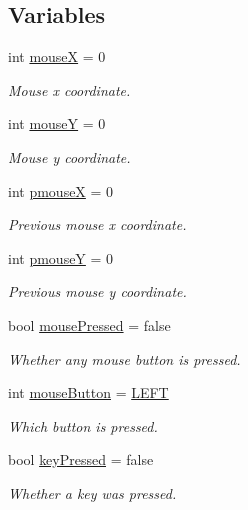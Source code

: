 \subsection*{\-Variables}
\begin{DoxyCompactItemize}
\item 
int \hyperlink{namespacecprocessing_aca55645dc8d20d72de21bc8cf2c5bcd0}{mouse\-X} = 0
\begin{DoxyCompactList}\small\item\em \-Mouse x coordinate. \end{DoxyCompactList}\item 
int \hyperlink{namespacecprocessing_ac81e2d0a39a3d606e9e6d870e31534ee}{mouse\-Y} = 0
\begin{DoxyCompactList}\small\item\em \-Mouse y coordinate. \end{DoxyCompactList}\item 
int \hyperlink{namespacecprocessing_afa6d39daa03165222e3c969b1ce26571}{pmouse\-X} = 0
\begin{DoxyCompactList}\small\item\em \-Previous mouse x coordinate. \end{DoxyCompactList}\item 
int \hyperlink{namespacecprocessing_a51d209877748101ea857d64bc9b6ff2d}{pmouse\-Y} = 0
\begin{DoxyCompactList}\small\item\em \-Previous mouse y coordinate. \end{DoxyCompactList}\item 
bool \hyperlink{namespacecprocessing_a02981e7550d1c27e3ae792450172f4b7}{mouse\-Pressed} = false
\begin{DoxyCompactList}\small\item\em \-Whether any mouse button is pressed. \end{DoxyCompactList}\item 
int \hyperlink{namespacecprocessing_ac291906023e7749b6351265a5a5f589e}{mouse\-Button} = \hyperlink{namespacecprocessing_a39d84f96f7411fee29eda510a17b1089ac8df9c95ae0f6e4eafb5e419637d7603}{\-L\-E\-F\-T}
\begin{DoxyCompactList}\small\item\em \-Which button is pressed. \end{DoxyCompactList}\item 
bool \hyperlink{namespacecprocessing_afc97118ddb342c47a4b70c6965dfee09}{key\-Pressed} = false
\begin{DoxyCompactList}\small\item\em \-Whether a key was pressed. \end{DoxyCompactList}\item 

\end{DoxyCompactItemize}
